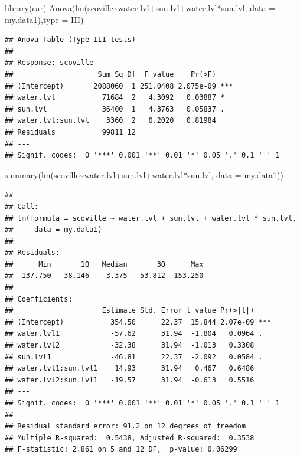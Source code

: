 \documentclass[
]{book}
\newenvironment{Shaded}{\begin{snugshade}}{\end{snugshade}}
\newcommand{\AttributeTok}[1]{\textcolor[rgb]{0.77,0.63,0.00}{#1}}
\newcommand{\FunctionTok}[1]{\textcolor[rgb]{0.00,0.00,0.00}{#1}}
\newcommand{\NormalTok}[1]{#1}
\newcommand{\SpecialCharTok}[1]{\textcolor[rgb]{0.00,0.00,0.00}{#1}}
\newcommand{\StringTok}[1]{\textcolor[rgb]{0.31,0.60,0.02}{#1}}
\begin{document}
\begin{Shaded}
\begin{Highlighting}[]
\FunctionTok{library}\NormalTok{(car)}
\FunctionTok{Anova}\NormalTok{(}\FunctionTok{lm}\NormalTok{(scoville}\SpecialCharTok{\textasciitilde{}}\NormalTok{water.lvl}\SpecialCharTok{+}\NormalTok{sun.lvl}\SpecialCharTok{+}\NormalTok{water.lvl}\SpecialCharTok{*}\NormalTok{sun.lvl, }\AttributeTok{data =}\NormalTok{ my.data1),}\AttributeTok{type =} \StringTok{\textquotesingle{}III\textquotesingle{}}\NormalTok{)}
\end{Highlighting}
\end{Shaded}

\begin{verbatim}
## Anova Table (Type III tests)
## 
## Response: scoville
##                    Sum Sq Df  F value    Pr(>F)    
## (Intercept)       2088060  1 251.0408 2.075e-09 ***
## water.lvl           71684  2   4.3092   0.03887 *  
## sun.lvl             36400  1   4.3763   0.05837 .  
## water.lvl:sun.lvl    3360  2   0.2020   0.81984    
## Residuals           99811 12                       
## ---
## Signif. codes:  0 '***' 0.001 '**' 0.01 '*' 0.05 '.' 0.1 ' ' 1
\end{verbatim}

\begin{Shaded}
\begin{Highlighting}[]
\FunctionTok{summary}\NormalTok{(}\FunctionTok{lm}\NormalTok{(scoville}\SpecialCharTok{\textasciitilde{}}\NormalTok{water.lvl}\SpecialCharTok{+}\NormalTok{sun.lvl}\SpecialCharTok{+}\NormalTok{water.lvl}\SpecialCharTok{*}\NormalTok{sun.lvl, }\AttributeTok{data =}\NormalTok{ my.data1))}
\end{Highlighting}
\end{Shaded}

\begin{verbatim}
## 
## Call:
## lm(formula = scoville ~ water.lvl + sun.lvl + water.lvl * sun.lvl, 
##     data = my.data1)
## 
## Residuals:
##      Min       1Q   Median       3Q      Max 
## -137.750  -38.146   -3.375   53.812  153.250 
## 
## Coefficients:
##                     Estimate Std. Error t value Pr(>|t|)    
## (Intercept)           354.50      22.37  15.844 2.07e-09 ***
## water.lvl1            -57.62      31.94  -1.804   0.0964 .  
## water.lvl2            -32.38      31.94  -1.013   0.3308    
## sun.lvl1              -46.81      22.37  -2.092   0.0584 .  
## water.lvl1:sun.lvl1    14.93      31.94   0.467   0.6486    
## water.lvl2:sun.lvl1   -19.57      31.94  -0.613   0.5516    
## ---
## Signif. codes:  0 '***' 0.001 '**' 0.01 '*' 0.05 '.' 0.1 ' ' 1
## 
## Residual standard error: 91.2 on 12 degrees of freedom
## Multiple R-squared:  0.5438, Adjusted R-squared:  0.3538 
## F-statistic: 2.861 on 5 and 12 DF,  p-value: 0.06299
\end{verbatim}
\end{document}
